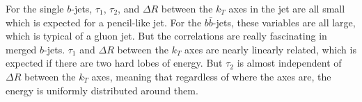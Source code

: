 For the single $b$-jets, $\tau_1$, $\tau_2$, and $\Delta R$ between the $k_T$ axes in the jet are all small which is expected for a pencil-like jet.  For the $b \bar{b}$-jets, these variables are all large, which is typical of a gluon jet.  But the correlations are really fascinating in merged $b$-jets.   $\tau_1$ and $\Delta R$ between the $k_T$ axes are nearly linearly related, which is expected if there are two hard lobes of energy.  But $\tau_2$ is almost independent of $\Delta R$ between the $k_T$ axes, meaning that regardless of where the axes are, the energy is uniformly distributed around them.




